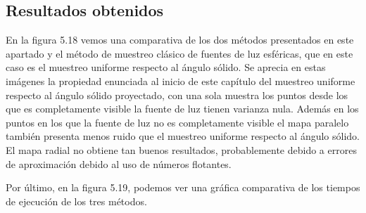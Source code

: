 \subsection{Resultados obtenidos}
En la figura 5.18 vemos una comparativa de los dos métodos presentados en este apartado y el método de muestreo clásico de fuentes de luz esféricas, que en este caso es el muestreo uniforme respecto al ángulo sólido. Se aprecia en estas imágenes la propiedad enunciada al inicio de este capítulo del muestreo uniforme respecto al ángulo sólido proyectado, con una sola muestra los puntos desde los que es completamente visible la fuente de luz tienen varianza nula. Además en los puntos en los que la fuente de luz no es completamente visible el mapa paralelo también presenta menos ruido que el muestreo uniforme respecto al ángulo sólido. El mapa radial no obtiene tan buenos resultados, probablemente debido a errores de aproximación debido al uso de números flotantes.

Por último, en la figura 5.19, podemos ver una gráfica comparativa de los tiempos de ejecución de los tres métodos.

